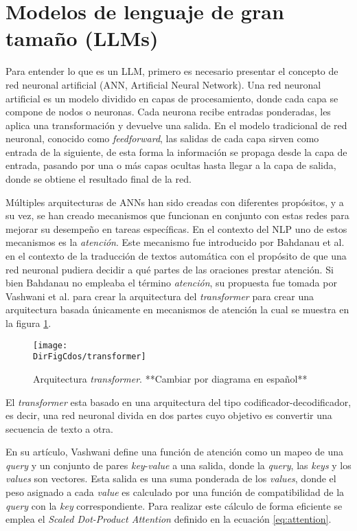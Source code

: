 \section{Modelos de lenguaje de gran tamaño (LLMs)}

Para entender lo que es un LLM, primero es necesario presentar el concepto
de red neuronal artificial (ANN, Artificial Neural Network).
Una red neuronal artificial es un modelo dividido en capas de
procesamiento, donde cada capa se compone de nodos o neuronas. Cada neurona
recibe entradas ponderadas, les aplica una transformación y devuelve una
salida. En el modelo tradicional de red neuronal, conocido como
\textit{feedforward}, las salidas de cada capa sirven como entrada de la
siguiente, de esta forma la información se propaga
desde la capa de entrada, pasando por una o más capas ocultas hasta llegar
a la capa de salida, donde se obtiene el resultado final de la red.

Múltiples arquitecturas de ANNs han sido creadas con diferentes propósitos,
y a su vez, se han creado mecanismos que funcionan en conjunto con estas
redes para mejorar su desempeño en tareas específicas. En el contexto del
NLP uno de estos mecanismos es la \textit{atención}. Este mecanismo
fue introducido por Bahdanau et al. \cite{bahdanau_neural_2016} en el contexto
de la traducción de textos automática con el propósito de que una red neuronal
pudiera decidir a qué partes de las oraciones prestar atención.
Si bien Bahdanau no empleaba el término \textit{atención}, su propuesta fue
tomada por Vashwani et al. \cite{vaswani_attention_2017} para crear la
arquitectura del \textit{transformer} para crear una arquitectura basada
únicamente en mecanismos de atención la cual se muestra en la figura
\ref{fig:transformer}.

\begin{figure}[]
    \centering
    \texttt{[image: \\DirFigCdos/transformer]}
    \caption{Arquitectura \textit{transformer}. **Cambiar por diagrama en español**}
    \label{fig:transformer}
\end{figure}

El \textit{transformer} esta basado en una arquitectura del tipo
codificador-decodificador, es decir, una red neuronal divida en dos partes
cuyo objetivo es convertir una secuencia de texto a otra.

En su artículo, Vashwani define una función de atención como un mapeo de una
\textit{query} y un conjunto de pares \textit{key}-\textit{value} a una salida,
donde la \textit{query}, las \textit{keys} y los \textit{values} son vectores.
Esta salida es una suma ponderada de los \textit{values}, donde el peso
asignado a cada \textit{value} es calculado por una función de compatibilidad de la
\textit{query} con la \textit{key} correspondiente. Para realizar este
cálculo de forma eficiente se emplea el \textit{Scaled Dot-Product Attention}
definido en la ecuación \ref{eq:attention}.

